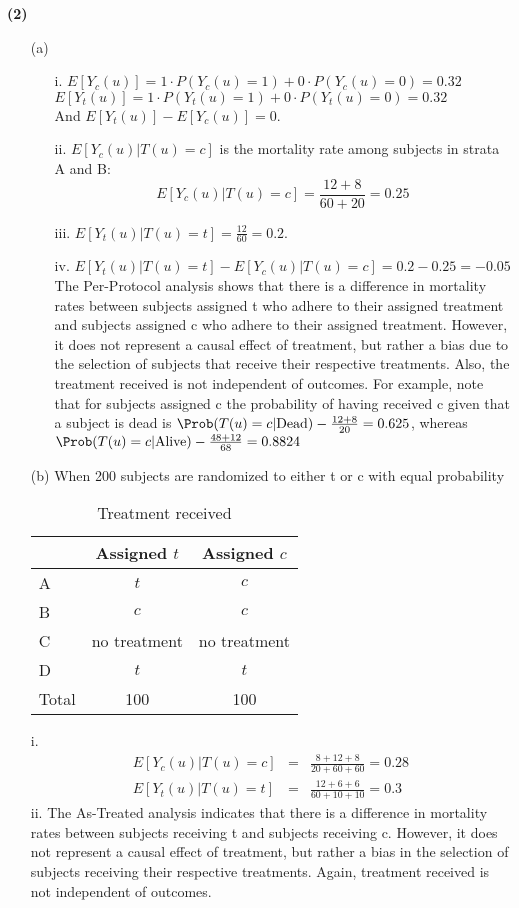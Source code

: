 \documentclass[11pt,a4paper]{article}
\begin{document}
\noindent
\textbf{(2)} 
\begin{enumerate}
\item[(a)]
\begin{enumerate}
\item[i.] 
$ E[Y_c(u)] = 1\cdot P(Y_c(u)=1) + 0\cdot P(Y_c(u)=0) = 0.32 $\\
$ E[Y_t(u)] = 1\cdot P(Y_t(u)=1) + 0\cdot P(Y_t(u)=0) = 0.32 $\\

And $E[Y_t(u)]-E[Y_c(u)]=0$.
\item[ii.] $E[Y_c(u)|T(u)=c]$ is the mortality rate among subjects in strata A and B:
$$E[Y_c(u)|T(u)=c]=\frac{12+8}{60+20}=0.25$$

\item[iii.] $ E[Y_t(u)|T(u)=t]=\frac{12}{60}=0.2$. 

\item[iv.] $E[Y_t(u)|T(u)=t]-E[Y_c(u)|T(u)=c]=0.2 - 0.25 = -0.05$ \\
The Per-Protocol analysis shows that there is a difference in mortality rates between subjects assigned t who adhere to their assigned treatment and subjects assigned c who adhere to their assigned treatment. However, it does not represent a causal effect of treatment, but rather a bias due to the selection of subjects that receive their respective treatments. 
Also, the treatment received is not independent of outcomes. For example, note that for subjects assigned c the probability of having received c given that a subject is dead is $\Prob(T(u) = c | \text{Dead}) - \frac{12 + 8}{20} = 0.625$, whereas $\Prob(T(u) = c | \text{Alive}) - \frac{48+12}{68} = 0.8824$

\end{enumerate}

\item[(b)] When 200 subjects are randomized to either t or c with equal probability

\begin{table}[H]
\centering
\begin{tabular}{lcc}
\hline
 &  Assigned $t$ & Assigned $c$\\ 
\hline
A&$t$& $c$\\
B&$c$&$c$\\
C&no treatment&no treatment\\
D& $t$& $t$\\
\hline
Total & 100 & 100\\
\hline
\end{tabular}
\caption{Treatment received}
\end{table}
i.
\begin{eqnarray*}
 E[Y_c(u)|T(u)=c]&=& \frac{8+12+8}{20+60+60}=0.28 \\
 E[Y_t(u)|T(u)=t]&=& \frac{12+6+6}{60+10+10}=0.3
\end{eqnarray*}
ii. The As-Treated analysis indicates that there is a difference in mortality rates between subjects receiving t and subjects receiving c. However, it does not represent a causal effect of treatment, but rather a bias in the selection of subjects receiving their respective treatments. Again, treatment received is not independent of outcomes.


\end{enumerate}
\end{document}
